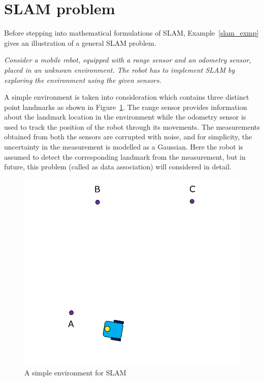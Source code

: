 \section{SLAM problem} \label{sec::sp}
Before stepping into mathematical formulations of \acs{SLAM}, Example~\ref{slam_exmp} gives an illustration of a general SLAM problem. 
\begin{exmp}
{\it Consider a mobile robot, equipped with a range sensor and an odometry sensor, placed in an unknown environment. The robot has to implement SLAM by exploring the environment using the given sensors.}

A simple environment is taken into consideration which contains three distinct point landmarks as shown in Figure~\ref{slam_example1}. The range sensor provides information about the landmark location in the environment while the odometry sensor is used to track the position of the robot through its movements. The measurements obtained from both the sensors are corrupted with noise, and for simplicity, the uncertainty in the measurement is modelled as a Gaussian. Here the robot is assumed to detect the corresponding landmark from the measurement, but in future, this problem (called as data association) will considered in detail.   
\begin{figure}
\centering
\includegraphics[scale=0.3]{./images/slam_example1}
\caption[Sample environment for a SLAM example]{A simple environment for SLAM\footnotemark}
\label{slam_example1}
\end{figure}

\end{exmp}
